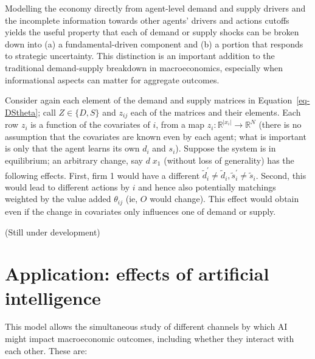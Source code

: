 \documentclass[
]{article}
\theoremstyle{definition}
\theoremstyle{plain}
\theoremstyle{remark}
\begin{document}
Modelling the economy directly from agent-level demand and supply
drivers and the incomplete information towards other agents' drivers and
actions cutoffs yields the useful property that each of demand or supply
shocks can be broken down into (a) a fundamental-driven component and
(b) a portion that responds to strategic uncertainty. This distinction
is an important addition to the traditional demand-supply breakdown in
macroeconomics, especially when informational aspects can matter for
aggregate outcomes.

Consider again each element of the demand and supply matrices in
Equation~\ref{eq-DStheta}; call \(Z \in \{D, S\}\) and \(z_{ij}\) each
of the matrices and their elements. Each row \(z_i\) is a function of
the covariates of \(i\), from a map
\(z_i : \mathbb{R}^{|x_i|} \to \mathbb{R}^N\) (there is no assumption
that the covariates are known even by each agent; what is important is
only that the agent learns its own \(d_i\) and \(s_i\)). Suppose the
system is in equilibrium; an arbitrary change, say \(d \;x_1\) (without
loss of generality) has the following effects. First, firm 1 would have
a different
\(\tilde{d}_i^{'} \neq \tilde{d}_i, \tilde{s}_i^{'} \neq \tilde{s}_i\).
Second, this would lead to different actions by \(i\) and hence also
potentially matchings weighted by the value added \(\theta_{ij}\) (ie,
\(O\) would change). This effect would obtain even if the change in
covariates only influences one of demand or supply.

(Still under development)

\section{Application: effects of artificial intelligence}\label{sec-AI}

This model allows the simultaneous study of different channels by which
AI might impact macroeconomic outcomes, including whether they interact
with each other. These are:
\end{document}
